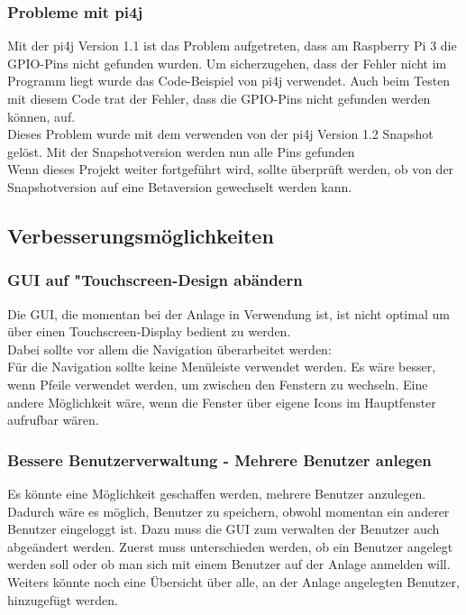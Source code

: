 \subsubsection{Probleme mit pi4j}
Mit der \ac{pi4j} Version 1.1 ist das Problem aufgetreten, dass am Raspberry Pi 3 die \ac{GPIO}-Pins nicht gefunden wurden. Um sicherzugehen, dass der Fehler nicht im Programm liegt wurde das Code-Beispiel von \ac{pi4j} verwendet. Auch beim Testen mit diesem Code trat der Fehler, dass die \ac{GPIO}-Pins nicht gefunden werden können, auf.
\\ Dieses Problem wurde mit dem verwenden von der \ac{pi4j} Version 1.2 Snapshot gelöst. Mit der Snapshotversion werden nun alle Pins gefunden
\\ Wenn dieses Projekt weiter fortgeführt wird, sollte überprüft werden, ob von der Snapshotversion auf eine Betaversion gewechselt werden kann.

\subsection{Verbesserungsmöglichkeiten}
\subsubsection{GUI auf "Touchscreen-Design\grqq{} abändern}
Die \ac{GUI}, die momentan bei der Anlage in Verwendung ist, ist nicht optimal um über einen Touchscreen-Display bedient zu werden.
\\ Dabei sollte vor allem die Navigation überarbeitet werden: 
\\Für die Navigation sollte keine Menüleiste verwendet werden. Es wäre besser, wenn Pfeile verwendet werden, um zwischen den Fenstern zu wechseln. Eine andere Möglichkeit wäre, wenn die Fenster über eigene Icons im Hauptfenster aufrufbar wären.
\subsubsection{Bessere Benutzerverwaltung - Mehrere Benutzer anlegen}
Es könnte eine Möglichkeit geschaffen werden, mehrere Benutzer anzulegen. Dadurch wäre es möglich, Benutzer zu speichern, obwohl momentan ein anderer Benutzer eingeloggt ist. Dazu muss die \ac{GUI} zum verwalten der Benutzer auch abgeändert werden. Zuerst muss unterschieden werden, ob ein Benutzer angelegt werden soll oder ob man sich mit einem Benutzer auf der Anlage anmelden will. Weiters könnte noch eine Übersicht über alle, an der Anlage angelegten Benutzer, hinzugefügt werden.
